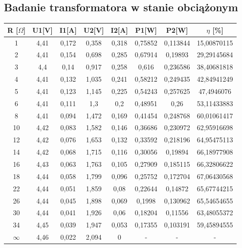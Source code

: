 \documentclass[polish,a4paper]{article}
\begin{document}
\subsection{Badanie transformatora w stanie obciążonym}
\begin{table}[H]
\centering
\begin{tabular}{|c|c|c|c|c|c|c|c|}
\hline
R [$\Omega$] &  U1[V] &  I1[A] &  U2[V] &  I2[A] &  P1[W] &  P2[W] &  $\eta$ [\%] \\
\hline
1 &  4,41 &  0,172 &  0,358 &  0,318 &  0,75852 &  0,113844 &  15,00870115 \\
2 &  4,41 &  0,154 &  0,698 &  0,285 &  0,67914 &  0,19893 &  29,29145684 \\
3 &  4,4 &  0,14 &  0,917 &  0,258 &  0,616 &  0,236586 &  38,40681818 \\
4 &  4,41 &  0,132 &  1,035 &  0,241 &  0,58212 &  0,249435 &  42,84941249 \\
5 &  4,41 &  0,123 &  1,145 &  0,225 &  0,54243 &  0,257625 &  47,4946076 \\
6 &  4,41 &  0,111 &  1,3 &  0,2 &  0,48951 &  0,26 &  53,11433883 \\
8 &  4,41 &  0,094 &  1,472 &  0,169 &  0,41454 &  0,248768 &  60,01061417 \\
10 &  4,42 &  0,083 &  1,582 &  0,146 &  0,36686 &  0,230972 &  62,95916698 \\
12 &  4,42 &  0,076 &  1,653 &  0,132 &  0,33592 &  0,218196 &  64,95475113 \\
14 &  4,42 &  0,068 &  1,715 &  0,116 &  0,30056 &  0,19894 &  66,18977908 \\
16 &  4,43 &  0,063 &  1,763 &  0,105 &  0,27909 &  0,185115 &  66,32806622 \\
18 &  4,44 &  0,058 &  1,799 &  0,096 &  0,25752 &  0,172704 &  67,06430568 \\
22 &  4,44 &  0,051 &  1,859 &  0,08 &  0,22644 &  0,14872 &  65,67744215 \\
26 &  4,44 &  0,045 &  1,898 &  0,069 &  0,1998 &  0,130962 &  65,54654655 \\
30 &  4,44 &  0,041 &  1,926 &  0,06 &  0,18204 &  0,11556 &  63,48055372 \\
34 &  4,45 &  0,039 &  1,947 &  0,053 &  0,17355 &  0,103191 &  59,45894555 \\
$\infty$ &  4,46 &  0,022 &  2,094 &  0 &  - &  - &  - \\
\hline
\end{tabular}
\end{table}
\end{document}
